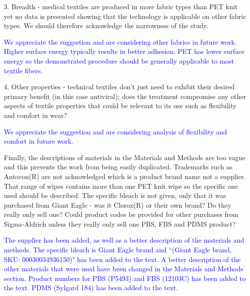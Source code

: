 \documentclass[12pt]{letter}
\newcommand{\blue}[1]{\textcolor{blue}{#1}} %
\begin{document}
3. Breadth - medical textiles are produced in more fabric types than PET knit yet no data is presented showing that the technology is applicable on other fabric types. We should therefore acknowledge the narrowness of the study.

\blue{We appreciate the suggestion and are considering other fabrics in future work. Higher surface energy
typically results in better adhesion. PET has lower surface energy so the demonstrated procedure
should be generally applicable to most textile fibers.}

4. Other properties - technical textiles don't just need to exhibit their desired primary benefit (in this case antiviral); does the treatment compromise any other aspects of textile properties that could be relevant to its use such as flexibility and comfort in wear?

\blue{We appreciate the suggestion and are considering analysis of flexibility and comfort 
in future work.}

Finally, the descriptions of materials in the Materials and Methods are too vague and this prevents the work from being easily duplicated. Trademarks such as Antocon(R) are not acknowledged which is a product brand name not a supplier. That range of wipes contains more than one PET knit wipe so the specific one used should be described. The specific bleach is not given, only that it was purchased from Giant Eagle - was it Clorox(R) or their own brand? Do they really only sell one? Could product codes be provided for other purchases from Sigma-Aldrich unless they really only sell one PBS, FBS and PDMS product?

\blue{The supplier has been added, as well as a better description of the materials and methods. The specific bleach is Giant Eagle brand and ``(Giant Eagle brand, SKU: 00030034936150)" has been added to the text. 
A better description of the other materials that were used have been changed in the Materials and Methods section. Product numbers for PBS (P5493) and FBS (12103C) has been added to the text. PDMS (Sylgard 184) has been added to the text. 
}
\end{document}
